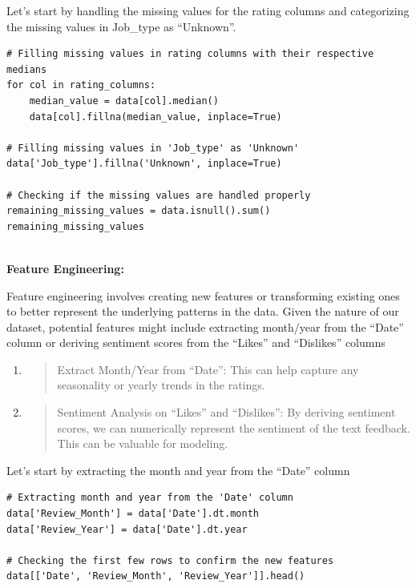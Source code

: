 \documentclass[
]{article}
\begin{document}
Let's start by handling the missing values for the rating columns and
categorizing the missing values in Job\_type as ``Unknown''.

\begin{verbatim}
# Filling missing values in rating columns with their respective medians
for col in rating_columns:
    median_value = data[col].median()
    data[col].fillna(median_value, inplace=True)

# Filling missing values in 'Job_type' as 'Unknown'
data['Job_type'].fillna('Unknown', inplace=True)

# Checking if the missing values are handled properly
remaining_missing_values = data.isnull().sum()
remaining_missing_values
 
\end{verbatim}

\textbf{Feature Engineering:}

Feature engineering involves creating new features or transforming
existing ones to better represent the underlying patterns in the data.
Given the nature of our dataset, potential features might include
extracting month/year from the ``Date'' column or deriving sentiment
scores from the ``Likes'' and ``Dislikes'' columns

\begin{enumerate}
\def\labelenumi{\arabic{enumi}.}
\item
  \begin{quote}
  Extract Month/Year from ``Date'': This can help capture any
  seasonality or yearly trends in the ratings.
  \end{quote}
\item
  \begin{quote}
  Sentiment Analysis on ``Likes'' and ``Dislikes'': By deriving
  sentiment scores, we can numerically represent the sentiment of the
  text feedback. This can be valuable for modeling.
  \end{quote}
\end{enumerate}

Let's start by extracting the month and year from the ``Date'' column

\begin{verbatim}
# Extracting month and year from the 'Date' column
data['Review_Month'] = data['Date'].dt.month
data['Review_Year'] = data['Date'].dt.year

# Checking the first few rows to confirm the new features
data[['Date', 'Review_Month', 'Review_Year']].head()

\end{verbatim}
\end{document}
